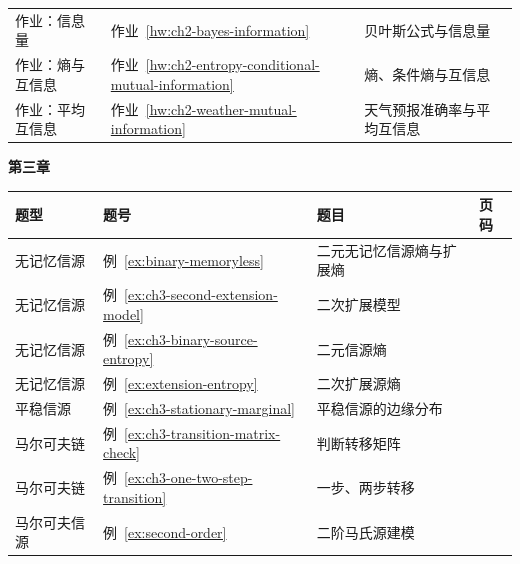 {\begin{tabularx}{\textwidth}{@{}p{}p{}>{\raggedright\arraybackslash}X>{\raggedleft\arraybackslash}p{}@{}}
作业：信息量 & 作业~\ref{hw:ch2-bayes-information} & 贝叶斯公式与信息量 & \hyperref[hw:ch2-bayes-information]{\pageref*{hw:ch2-bayes-information}}  \\
作业：熵与互信息 & 作业~\ref{hw:ch2-entropy-conditional-mutual-information} & 熵、条件熵与互信息 & \hyperref[hw:ch2-entropy-conditional-mutual-information]{\pageref*{hw:ch2-entropy-conditional-mutual-information}}  \\
作业：平均互信息 & 作业~\ref{hw:ch2-weather-mutual-information} & 天气预报准确率与平均互信息 & \hyperref[hw:ch2-weather-mutual-information]{\pageref*{hw:ch2-weather-mutual-information}}  \\
\bottomrule
\end{tabularx}

\noindent\textbf{第三章}\par
\begin{tabularx}{\textwidth}{@{}p{}p{}>{\raggedright\arraybackslash}X>{\raggedleft\arraybackslash}p{}@{}}
\toprule
\textbf{题型} & \textbf{题号} & \textbf{题目} & \textbf{页码} \\
\midrule
无记忆信源 & 例~\ref{ex:binary-memoryless} & 二元无记忆信源熵与扩展熵 & \hyperref[ex:binary-memoryless]{\pageref*{ex:binary-memoryless}}  \\
无记忆信源 & 例~\ref{ex:ch3-second-extension-model} & 二次扩展模型 & \hyperref[ex:ch3-second-extension-model]{\pageref*{ex:ch3-second-extension-model}}  \\
无记忆信源 & 例~\ref{ex:ch3-binary-source-entropy} & 二元信源熵 & \hyperref[ex:ch3-binary-source-entropy]{\pageref*{ex:ch3-binary-source-entropy}}  \\
无记忆信源 & 例~\ref{ex:extension-entropy} & 二次扩展源熵 & \hyperref[ex:extension-entropy]{\pageref*{ex:extension-entropy}}  \\
平稳信源 & 例~\ref{ex:ch3-stationary-marginal} & 平稳信源的边缘分布 & \hyperref[ex:ch3-stationary-marginal]{\pageref*{ex:ch3-stationary-marginal}}  \\
马尔可夫链 & 例~\ref{ex:ch3-transition-matrix-check} & 判断转移矩阵 & \hyperref[ex:ch3-transition-matrix-check]{\pageref*{ex:ch3-transition-matrix-check}}  \\
马尔可夫链 & 例~\ref{ex:ch3-one-two-step-transition} & 一步、两步转移 & \hyperref[ex:ch3-one-two-step-transition]{\pageref*{ex:ch3-one-two-step-transition}}  \\
马尔可夫信源 & 例~\ref{ex:second-order} & 二阶马氏源建模 & \hyperref[ex:second-order]{\pageref*{ex:second-order}}  \\

\end{tabularx}}
